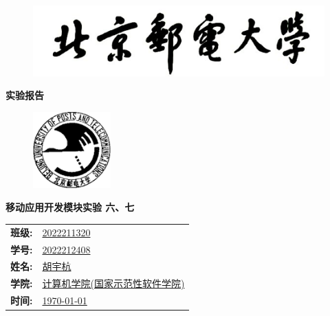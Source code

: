 \documentclass[UTF8, 12pt, a4paper, oneside]{ctexart}
\begin{document}
	\sloppy
	\thispagestyle{empty}
    \begin{figure}[t]
		\centering
		\includegraphics[width=13cm]{logo1.jpg}
	\end{figure}

    \begin{center}
        \Huge\textbf{实验报告}
    \end{center}
	\vspace*{1em}
    \begin{figure}[htbp]
		\centering
		\includegraphics[width=3cm]{logo2.jpg}
	\end{figure}
		\begin{center}
			\Huge\textbf{移动应用开发模块实验 六、七} 
		\end{center}
    \vspace*{5em}
	\begin{table}[htbp]
		\centering
		\large
		\begin{tabular}{ll}
        \textbf{班级:} & \underline{2022211320} \\
		\textbf{学号:} & \underline{2022212408} \\
		\textbf{姓名:} & \underline{胡宇杭} \\
		\textbf{学院:} & \underline{计算机学院(国家示范性软件学院)} \\
        \textbf{时间:} & \underline{\today} \\
		\end{tabular}
	\end{table}
	\newpage
	\tableofcontents
    \newpage
    
    
    
\end{document}
